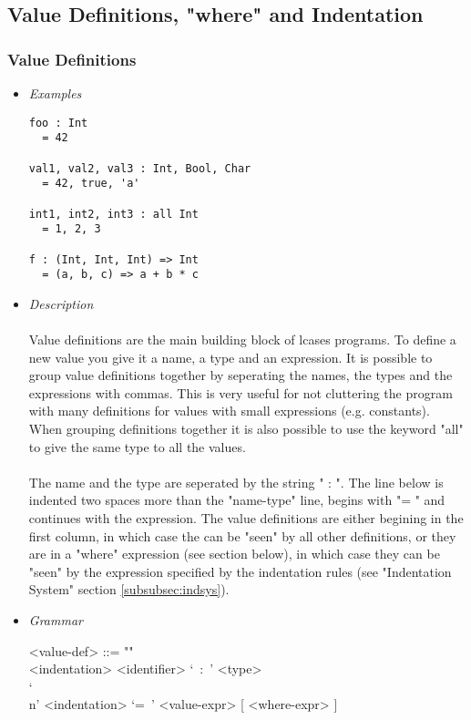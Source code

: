 \documentclass{article}
\begin{document}
\subsection{Value Definitions, "where" and Indentation}
\label{subsec:valdefswhere}

\subsubsection{Value Definitions}
\label{subsubsec:valdefs}

\begin{itemize}

\item \textit{Examples}

\begin{verbatim}
foo : Int
  = 42

val1, val2, val3 : Int, Bool, Char
  = 42, true, 'a'

int1, int2, int3 : all Int
  = 1, 2, 3

f : (Int, Int, Int) => Int
  = (a, b, c) => a + b * c
\end{verbatim}

\item \textit{Description}\\\\
Value definitions are the main building block of lcases programs. To define a
new value you give it a name, a type and an expression. It is possible to group
value definitions together by seperating the names, the types and the
expressions with commas. This is very useful for not cluttering the program
with many definitions for values with small expressions (e.g. constants).  When
grouping definitions together it is also possible to use the keyword "all" to
give the same type to all the values.
\\\\
The name and the type are seperated by the string " : ". The line below is
indented two spaces more than the "name-type" line, begins with "= " and
continues with the expression.  The value definitions are either begining in
the first column, in which case the can be "seen" by all other definitions, or
they are in a "where" expression (see section below), in which case they can be
"seen" by the expression specified by the indentation rules (see "Indentation
System" section \ref{subsubsec:indsys}).

\item \textit{Grammar}
\begin{grammar}
<value-def> ::= ""\\
<indentation> <identifier> `\ :\ ' <type> \\
`\\n' <indentation> `=\ ' <value-expr> [ <where-expr> ]


\end{grammar}
\end{itemize}
\end{document}
